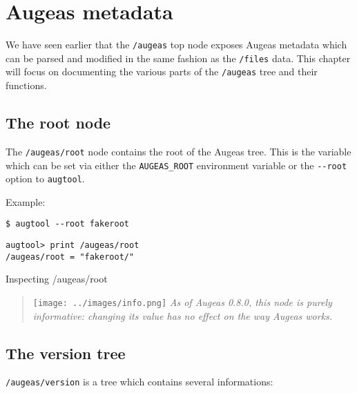 \chapter{Augeas metadata}


We have seen earlier that the \verb!/augeas! top node exposes Augeas metadata which can be parsed and modified in the same fashion as the \verb!/files! data. This chapter will focus on documenting the various parts of the \verb!/augeas! tree and their functions.

\section{The root node}

  

The \verb!/augeas/root! node contains the root of the Augeas tree. This is the variable which can be set via either the \verb!AUGEAS_ROOT! environment variable or the \verb!--root! option to \verb!augtool!.


Example:

\begin{listing}
  \begin{verbatim}
$ augtool --root fakeroot
  \end{verbatim}
  \begin{verbatim}
augtool> print /augeas/root
/augeas/root = "fakeroot/"
  \end{verbatim}
  \caption{Inspecting /augeas/root}
  \label{lst:metadata_root}
\end{listing}

\begin{quote}
\texttt{[image: ../images/info.png]} \emph{As of Augeas 0.8.0, this node is purely informative: changing its value has no effect on the way Augeas works.}

\end{quote}
\section{The version tree}


\verb!/augeas/version! is a tree which contains several informations:

